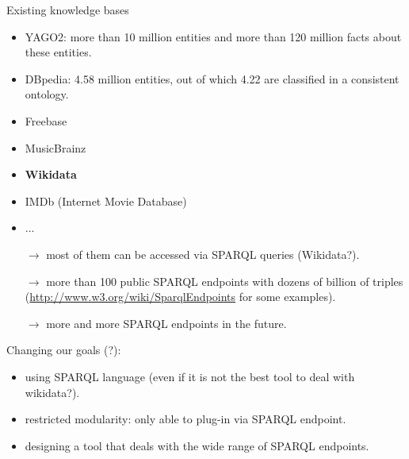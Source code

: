 \documentclass[10pt]{beamer}
\begin{document}

\begin{frame}

Existing knowledge bases

\begin{itemize}
	\item YAGO2: more than 10 million entities and more than 120 million facts about these entities.
	\item DBpedia: 4.58 million entities, out of which 4.22 are classified in a consistent ontology.
	\item Freebase
	\item MusicBrainz
	\item \textbf{Wikidata}
	\item IMDb (Internet Movie Database)
	\item ...
\end{itemize}

\begin{itemize}
	\item[$\rightarrow$] most of them can be accessed via SPARQL queries (Wikidata?).
	\item[$\rightarrow$] more than 100 public SPARQL endpoints with dozens of billion of triples (\url{http://www.w3.org/wiki/SparqlEndpoints} for some examples).
	\item[$\rightarrow$] more and more SPARQL endpoints in the future.
\end{itemize}

\end{frame}


\begin{frame}
 
\begin{alertblock}{Changing our goals (?):}
	\begin{itemize}
		\item using SPARQL language (even if it is not the best tool to deal with wikidata?).
		\item restricted modularity: only able to plug-in via SPARQL endpoint.
		\item designing a tool that deals with the wide range of SPARQL endpoints.
	\end{itemize}
\end{alertblock}

\end{frame}
\end{document}
